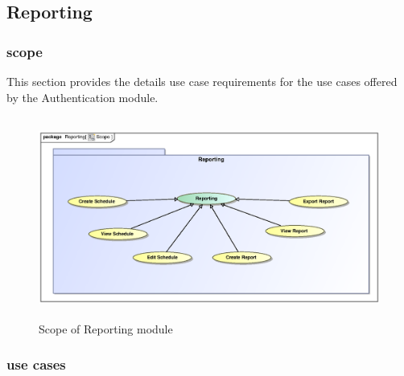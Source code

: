 \documentclass[12pt]{article}
\begin{document}
\subsection{Reporting}

\subsubsection{scope}
\par{This section provides the details use case requirements for the use cases offered by the Authentication
module.}

\begin{figure}[h]
\includegraphics[height=250px, width=500px]{epsImages/Reporting/ReportScope.eps}
\caption{Scope of Reporting module}
\end{figure}


\subsubsection{use cases}
\end{document}
